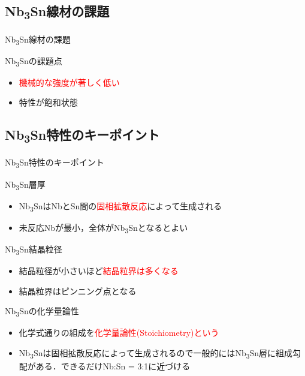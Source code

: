 \documentclass[aspectratio=169, unicode, 10pt]{beamer}
\begin{document}
	\subsection{Nb\textsubscript{3}Sn線材の課題}
	\begin{frame}{Nb\textsubscript{3}Sn線材の課題}
		\begin{block}{Nb\textsubscript{3}Snの課題点}
			\begin{itemize}
				\item \textcolor{red}{機械的な強度が著しく低い}
				\item 特性が飽和状態
			\end{itemize}
			\vspace{5mm}
		\end{block}
	\end{frame}

	\subsection{Nb\textsubscript{3}Sn特性のキーポイント}
	\begin{frame}{Nb\textsubscript{3}Sn特性のキーポイント}
			\begin{block}{Nb\textsubscript{3}Sn層厚}
				\begin{itemize}
					\item Nb\textsubscript{3}SnはNbとSn間の\textcolor{red}{固相拡散反応}によって生成される
					\item 未反応Nbが最小，全体がNb\textsubscript{3}Snとなるとよい
				\end{itemize}
			\end{block}
			\begin{block}{Nb\textsubscript{3}Sn結晶粒径}
				\begin{itemize}
					\item 結晶粒径が小さいほど\textcolor{red}{結晶粒界は多くなる}
					\item 結晶粒界はピンニング点となる
				\end{itemize}
			\end{block}
			\begin{block}{Nb\textsubscript{3}Snの化学量論性}
				\begin{itemize}
					\item 化学式通りの組成を\textcolor{red}{化学量論性(Stoichiometry)という}
					\item Nb\textsubscript{3}Snは固相拡散反応によって生成されるので一般的にはNb\textsubscript{3}Sn層に組成勾配がある．できるだけNb:Sn = 3:1に近づける
				\end{itemize}
			\end{block}
	\end{frame}
\end{document}
